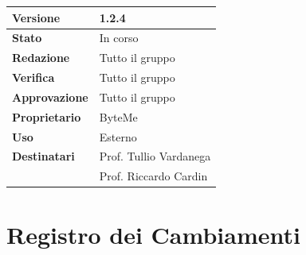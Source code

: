 \documentclass[11pt,a4paper]{article}
\begin{document}
\begin{titlepage}
    \begin{table}[H]
        \centering
        \begin{tabular}{|l|p{5cm}|}
            \hline
            \textbf{Versione} & 1.2.4 \\
            \hline
            \textbf{Stato} & In corso \\
            \hline
            \textbf{Redazione} & Tutto il gruppo \\
            \hline
            \textbf{Verifica} & Tutto il gruppo \\
            \hline
            \textbf{Approvazione} & Tutto il gruppo \\
            \hline
            \textbf{Proprietario} & ByteMe \\
            \hline
            \textbf{Uso} & Esterno \\
            \hline
            \textbf{Destinatari} & Prof. Tullio Vardanega \\ & Prof. Riccardo Cardin \\
            \hline
        \end{tabular}
    \end{table}
    
    \vfill
\end{titlepage}

\thispagestyle{empty}
\section*{Registro dei Cambiamenti}
\end{document}
